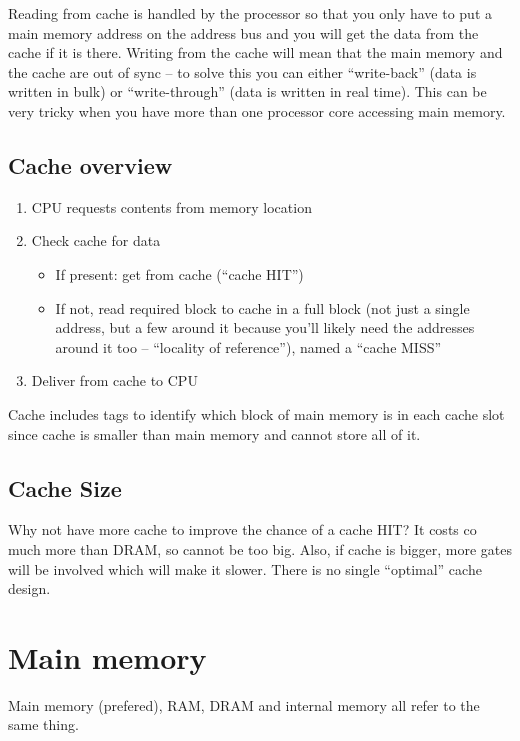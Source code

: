 Reading from cache is handled by the processor so that you only have to put a main memory address on the address bus and you will get the data from the cache if it is there.
Writing from the cache will mean that the main memory and the cache are out of sync -- to solve this you can either ``write-back'' (data is written in bulk) or ``write-through'' (data is written in real time).
This can be very tricky when you have more than one processor core accessing main memory.

\subsection{Cache overview}\label{sub:cache_overview}

\begin{enumerate}
    \item CPU requests contents from memory location
    \item Check cache for data
          \begin{itemize}
              \item If present: get from cache (``cache HIT'')
              \item If not, read required block to cache in a full block (not just a single address, but a few around it because you'll likely need the addresses around it too -- ``locality of reference''), named a ``cache MISS''
          \end{itemize}
    \item Deliver from cache to CPU
\end{enumerate}
Cache includes tags to identify which block of main memory is in each cache slot since cache is smaller than main memory and cannot store all of it.

\subsection{Cache Size}\label{sub:cache_size}

Why not have more cache to improve the chance of a cache HIT?
It costs co much more than DRAM, so cannot be too big.
Also, if cache is bigger, more gates will be involved which will make it slower.
There is no single ``optimal'' cache design.

\section{Main memory}\label{sec:main_memory}

Main memory (prefered), RAM, DRAM and internal memory all refer to the same thing.

